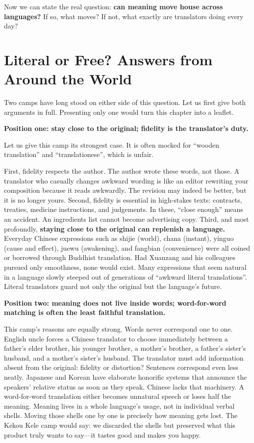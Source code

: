 Now we can state the real question: \textbf{can meaning move house across languages?} If so, what moves? If not, what exactly are translators doing every day?

\section[Literal or Free? Answers Worldwide]{Literal or Free? Answers from Around the World}
Two camps have long stood on either side of this question. Let us first give both arguments in full. Presenting only one would turn this chapter into a leaflet.

\textbf{Position one: stay close to the original; fidelity is the translator's duty.}

Let us give this camp its strongest case. It is often mocked for ``wooden translation'' and ``translationese'', which is unfair.

First, fidelity respects the author. The author wrote these words, not those. A translator who casually changes awkward wording is like an editor rewriting your composition because it reads awkwardly. The revision may indeed be better, but it is no longer yours. Second, fidelity is essential in high-stakes texts: contracts, treaties, medicine instructions, and judgements. In these, ``close enough'' means an accident. An ingredients list cannot become advertising copy. Third, and most profoundly, \textbf{staying close to the original can replenish a language.} Everyday Chinese expressions such as shijie (world), chana (instant), yinguo (cause and effect), juewu (awakening), and fangbian (convenience) were all coined or borrowed through Buddhist translation. Had Xuanzang and his colleagues pursued only smoothness, none would exist. Many expressions that seem natural in a language slowly steeped out of generations of ``awkward literal translations''. Literal translators guard not only the original but the language's future.

\textbf{Position two: meaning does not live inside words; word-for-word matching is often the least faithful translation.}

This camp's reasons are equally strong. Words never correspond one to one. English uncle forces a Chinese translator to choose immediately between a father's elder brother, his younger brother, a mother's brother, a father's sister's husband, and a mother's sister's husband. The translator must add information absent from the original: fidelity or distortion? Sentences correspond even less neatly. Japanese and Korean have elaborate honorific systems that announce the speakers' relative status as soon as they speak. Chinese lacks that machinery. A word-for-word translation either becomes unnatural speech or loses half the meaning. Meaning lives in a whole language's usage, not in individual verbal shells. Moving those shells one by one is precisely how meaning gets lost. The Kekou Kele camp would say: we discarded the shells but preserved what this product truly wants to say---it tastes good and makes you happy.


